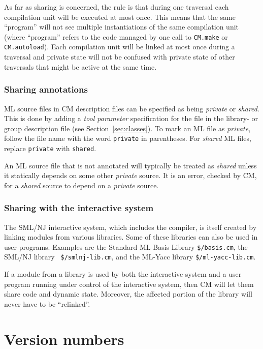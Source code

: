 \documentclass[titlepage,letterpaper]{article}
\begin{document}
As far as sharing is concerned, the rule is that during one traversal
each compilation unit will be executed at most once.  This means that
the same ``program'' will not see multiple instantiations of the same
compilation unit (where ``program'' refers to the code managed by one
call to {\tt CM.make} or {\tt CM.autoload}).  Each compilation unit
will be linked at most once during a traversal and private state
will not be confused with private state of other traversals that might
be active at the same time.


\subsubsection{Sharing annotations}

ML source files in CM description files can be specified as being {\em
private} or {\em shared}.  This is done by adding a {\em tool
parameter} specification for the file in the library- or group
description file (see Section~\ref{sec:classes}). To mark an ML file
as {\em private}, follow the file name with the word {\tt private} in
parentheses.  For {\em shared} ML files, replace {\tt private} with
{\tt shared}.

An ML source file that is not annotated will typically be treated as
{\em shared} unless it statically depends on some other {\em private}
source.  It is an error, checked by CM, for a {\em shared} source to
depend on a {\em private} source.

\subsubsection{Sharing with the interactive system}

The SML/NJ interactive system, which includes the compiler, is itself
created by linking modules from various libraries. Some of these
libraries can also be used in user programs.  Examples are the
Standard ML Basis Library {\tt \$/basis.cm}, the SML/NJ library {\tt
\$/smlnj-lib.cm}, and the ML-Yacc library {\tt \$/ml-yacc-lib.cm}.

If a module from a library is used by both the interactive system and
a user program running under control of the interactive system, then
CM will let them share code and dynamic state.  Moreover, the affected
portion of the library will never have to be ``relinked''.

\section{Version numbers}
\label{sec:versions}
\end{document}
